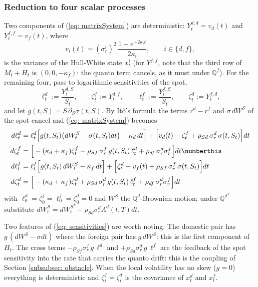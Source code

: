 \subsubsection{Reduction to four scalar processes}
Two components of (\ref{eq: matrixSystem}) are deterministic: $Y^{d,d}_t=v_d(t)$ and $Y^{f,f}_t=v_f(t)$, where
$$ v_i(t)=(\sigma^i_r)^2\,\frac{1-e^{-2\kappa_it}}{2\kappa_i},\qquad i\in\{d,f\}, $$
is the variance of the Hull-White state $x^i_t$ (for $Y^{f,f}$, note that the third row of $M_t+H_t$ is $(0,0,-\kappa_f)$: the quanto term cancels, as it must under $\mathbb{Q}^f$). For the remaining four, pass to logarithmic sensitivities of the spot,
$$ \ell^d_t:=\frac{Y^{d,S}_t}{S_t},\qquad \zeta^f_t:=Y^{d,f}_t,\qquad \ell^f_t:=\frac{Y^{f,S}_t}{S_t},\qquad \zeta^d_t:=Y^{f,d}_t , $$
and let $g(t,S)=S\,\partial_S\sigma(t,S)$. By It\^o's formula the terms $r^d-r^f$ and $\sigma\,dW^S$ of the spot cancel and (\ref{eq: matrixSystem}) becomes
\begin{align*}
d\ell^d_t &= \ell^d_t\Big[g(t,S_t)\big(dW^S_t-\sigma(t,S_t)dt\big)-\kappa_d\,dt\Big]
 +\Big[v_d(t)-\zeta^f_t+\rho_{Sd}\,\sigma^d_r\,\sigma(t,S_t)\Big]dt \\
d\zeta^f_t &= \Big[-(\kappa_d+\kappa_f)\zeta^f_t-\rho_{Sf}\,\sigma^f_r\,g(t,S_t)\,\ell^d_t
 +\rho_{df}\,\sigma^d_r\sigma^f_r\Big]dt \numberthis \label{eq: sensitivities}\\
d\ell^f_t &= \ell^f_t\Big[g(t,S_t)\,dW^S_t-\kappa_f\,dt\Big]
 +\Big[\zeta^d_t-v_f(t)+\rho_{Sf}\,\sigma^f_r\,\sigma(t,S_t)\Big]dt \\
d\zeta^d_t &= \Big[-(\kappa_d+\kappa_f)\zeta^d_t+\rho_{Sd}\,\sigma^d_r\,g(t,S_t)\,\ell^f_t
 +\rho_{df}\,\sigma^d_r\sigma^f_r\Big]dt
\end{align*}
with $\ell^d_0=\zeta^f_0=\ell^f_0=\zeta^d_0=0$ and $W^S$ the $\mathbb{Q}^d$-Brownian motion; under $\mathbb{Q}^{d^T}$ substitute $dW^S_t=dW^{S^T}_t-\rho_{Sd}\sigma^d_rA^d(t,T)dt$.

Two features of (\ref{eq: sensitivities}) are worth noting. The domestic pair has $g\,(dW^S-\sigma dt)$ where the foreign pair has $g\,dW^S$: this is the first component of $H_t$. The cross terms $-\rho_{Sf}\sigma^f_r\,g\,\ell^d$ and $+\rho_{Sd}\sigma^d_r\,g\,\ell^f$ are the feedback of the spot sensitivity into the rate that carries the quanto drift: this is the coupling of Section \ref{subsubsec: obstacle}. When the local volatility has no skew ($g=0$) everything is deterministic and $\zeta^f_t=\zeta^d_t$ is the covariance of $x^d_t$ and $x^f_t$.

